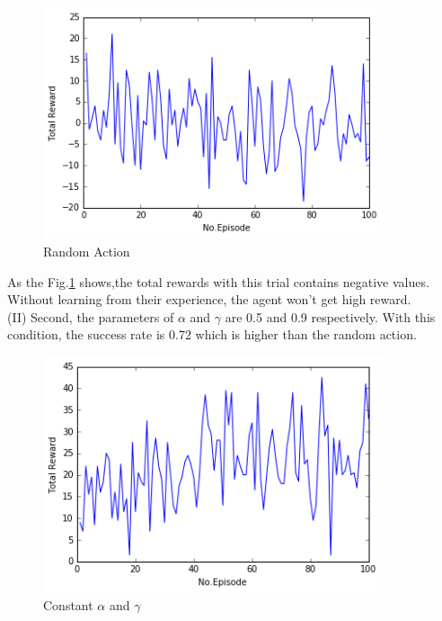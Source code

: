 \documentclass[a4paper,11pt]{article}
\begin{document}
        


\begin{figure}[H]
\begin{center}
\includegraphics[width=100mm]{graph/random.jpg}
\end{center}
\caption{Random Action}
\label{fig:one}
\end{figure}

As the Fig.\ref{fig:one} shows,the total rewards with this trial contains negative values.
Without learning from their experience, the agent won't get high reward.
\\


(I\hspace{-.1em}I) Second, the parameters of $\alpha$ and $\gamma$ are 0.5 and 0.9 respectively.
With this condition, the success rate is 0.72 which is higher than the random action.

\begin{figure}[H]
\begin{center}
\includegraphics[width=100mm]{graph/constant.jpg}
\end{center}
\caption{Constant $\alpha$ and $\gamma$}
\label{fig:two}
\end{figure}
\end{document}
